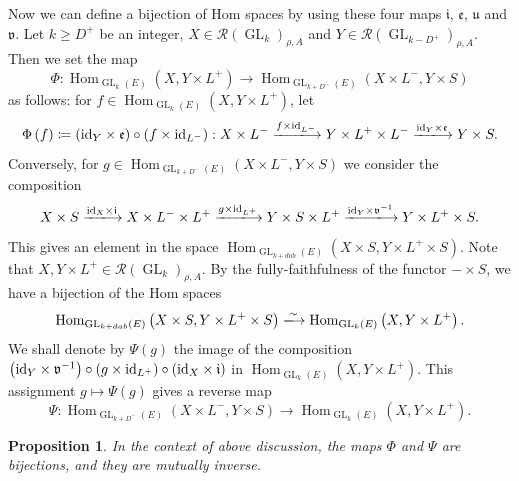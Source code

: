 \documentclass[11pt,letterpaper]{amsart}
\theoremstyle{plain}
\newcounter{theorem}[section]
\numberwithin{theorem}{section}
\numberwithin{equation}{subsection}
\newtheorem{Prop}[theorem]{Proposition}
\theoremstyle{remark}
\newcommand{\Hom}{\operatorname{Hom}}
\newcommand{\GL}{\operatorname{GL}}
\def\calR{\mathcal{R}}
\def\lra{\longrightarrow}
\begin{document}
Now we can define a bijection of Hom spaces by using these four maps $\mathfrak{i}$, $\mathfrak{e}$, $\mathfrak{u}$ and $\mathfrak{v}$. Let $k\geq D^+$ be an integer, $X\in\calR\left(\GL_{k}\right)_{\rho,A}$ and $Y\in\calR\left(\GL_{k-D^+}\right)_{\rho,A}$. Then we set the map
\[
    \Phi: \Hom_{\GL_k\left(E\right)}\left(X,Y\times L^+\right) \lra \Hom_{\GL_{k+D^-}\left(E\right)}\left(X\times L^-,Y\times S\right)
\]
as follows: for $f\in\Hom_{\GL_k\left(E\right)}\left(X,Y\times L^+\right)$, let
\[
    \Phi\left(f\right) \coloneqq \left({\rm id}_Y\times\mathfrak{e}\right)\circ \left(f\times {\rm id}_{L^-}\right): X\times L^- \xlongrightarrow{f\times {\rm id}_{L^-}} Y\times L^+\times L^- \xlongrightarrow{{\rm id}_Y\times\mathfrak{e}} Y\times S.
\]
Conversely, for $g\in\Hom_{\GL_{k+D^-}\left(E\right)}\left(X\times L^-,Y\times S\right)$ we consider the composition 
\[
    X\times S \xlongrightarrow{{\rm id}_X\times\mathfrak{i}} X\times L^-\times L^+ \xlongrightarrow{g\times{\rm id}_{L^+}} Y\times S\times L^+  \xlongrightarrow{{\rm id}_Y\times \mathfrak{v}^{-1}} Y\times L^+ \times S.
\]
This gives an element in the space $\Hom_{\GL_{k+dab}\left(E\right)}\left(X\times S, Y\times L^+\times S\right)$. Note that $X, Y\times L^+\in\calR\left(\GL_k\right)_{\rho,A}$. By the fully-faithfulness of the functor $-\times S$, we have a bijection of the Hom spaces
\[
    \Hom_{\GL_{k+dab}\left(E\right)}\left(X\times S, Y\times L^+\times S\right) \xlongrightarrow{\sim}\Hom_{\GL_k\left(E\right)}\left(X,Y\times L^+\right).
\]
We shall denote by $\Psi\left(g\right)$ the image of the composition $\left({\rm id}_Y\times \mathfrak{v}^{-1}\right)\circ\left(g\times{\rm id}_{L^+}\right)\circ\left({\rm id}_X\times\mathfrak{i}\right)$ in $\Hom_{\GL_k\left(E\right)}\left(X,Y\times L^+\right)$. This assignment $g\mapsto \Psi\left(g\right)$ gives a reverse map
\[
    \Psi: \Hom_{\GL_{k+D^-}\left(E\right)}\left(X\times L^-,Y\times S\right) \lra \Hom_{\GL_k\left(E\right)}\left(X,Y\times L^+\right).
\]

\begin{Prop}\label{P:ConvertHomSpaceApp}
In the context of above discussion, the maps $\Phi$ and $\Psi$ are bijections, and they are mutually inverse.
\end{Prop}

\vskip 5pt
\end{document}

